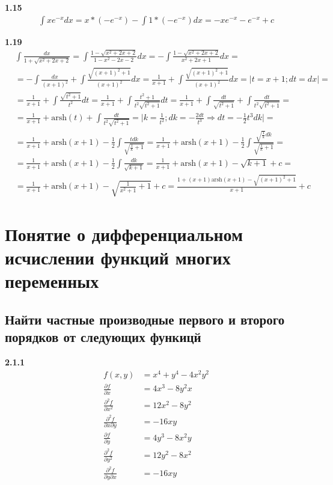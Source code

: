 \documentclass[a4paper, 12pt]{article}
\begin{document}
    \textbf{1.15}
    \begin{align*}
    \int{xe^{-x}}dx = x*(-e^{-x}) - \int{1*(-e^{-x})dx} = -xe^{-x} - e^{-x} + c
    \end{align*}
    
    \textbf{1.19}
    \begin{align*}
    &\int{\frac{dx}{1+\sqrt{x^2+2x+2}}} = 
    \int{\frac{1-\sqrt{x^2+2x+2}}{1-x^2-2x-2}dx} = 
    -\int{\frac{1 - \sqrt{x^2+2x+2}}{x^2+2x+1}dx} = \\
    &= -\int{\frac{dx}{(x+1)^2}} + \int{\frac{\sqrt{(x+1)^2+1}}{(x+1)^2}dx} = 
    \frac{1}{x+1} + \int{\frac{\sqrt{(x+1)^2+1}}{(x+1)^2}dx} = 
    \Big|t = x+1; dt = dx \Big| = \\
    &= \frac{1}{x+1} + \int{\frac{\sqrt{t^2+1}}{t^2}dt} = 
    \frac{1}{x+1} + \int{\frac{t^2+1}{t^2\sqrt{t^2+1}}dt} = 
    \frac{1}{x+1} + \int{\frac{dt}{\sqrt{t^2+1}}} + \int{\frac{dt}{t^2\sqrt{t^2+1}}} = \\
    &= \frac{1}{x+1} + \text{arsh}(t) + \int{\frac{dt}{t^2\sqrt{t^2+1}}} = 
    \Big| k = \frac{1}{t^2}; dk = -\frac{2dt}{t^3} \Rightarrow dt = -\frac{1}{2}t^3dk \Big| = \\
    &= \frac{1}{x+1} + \text{arsh}(x+1) -\frac{1}{2}\int{\frac{tdk}{\sqrt{\frac{1}{k}+1}}} = 
    \frac{1}{x+1} + \text{arsh}(x+1) -\frac{1}{2}\int{\frac{\sqrt{\frac{1}{k}}dk}{\sqrt{\frac{1}{k}+1}}} = \\
    &= \frac{1}{x+1} + \text{arsh}(x+1) -\frac{1}{2}\int{\frac{dk}{\sqrt{k+1}}} = 
    \frac{1}{x+1} + \text{arsh}(x+1) - \sqrt{k+1} +c = \\
    &= \frac{1}{x+1} + \text{arsh}(x+1) - \sqrt{\frac{1}{x^2+1}+1} +c = 
    \frac{1+(x+1)\text{arsh}(x+1)-\sqrt{(x+1)^2+1}}{x+1}+c
    \end{align*}
    
    \section{Понятие о дифференциальном исчислении функций многих переменных}
    
    \subsection{Найти частные производные первого и второго порядков от следующих функицй}
    
    \textbf{2.1.1}
    \begin{align*}
    f(x,y) &= x^4+y^4-4x^2y^2 \\
    \frac{\partial f}{\partial x} &= 4x^3-8y^2x \\
    \frac{\partial^2 f}{\partial x^2} &= 12x^2 - 8y^2 \\
    \frac{\partial^2 f}{\partial x \partial y} &= -16xy\\
    \frac{\partial f}{\partial y} &= 4y^3-8x^2y \\
    \frac{\partial^2 f}{\partial y^2} &= 12y^2 - 8x^2 \\
    \frac{\partial^2 f}{\partial y \partial x} &= -16xy\\
    \end{align*}
    
\end{document}
